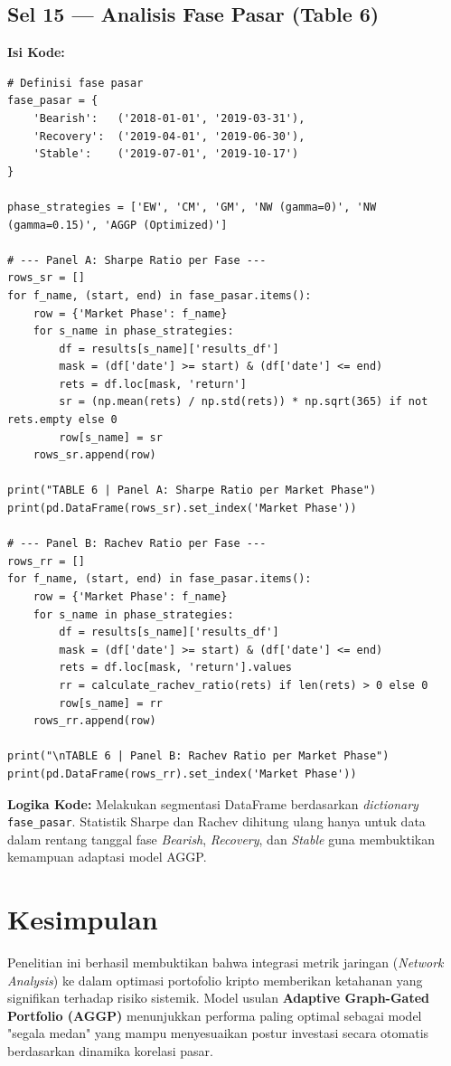 \documentclass[12pt, a4paper]{article}
\begin{document}
\subsection{Sel 15 — Analisis Fase Pasar (Table 6)}
\textbf{Isi Kode:}
\begin{lstlisting}
# Definisi fase pasar
fase_pasar = {
    'Bearish':   ('2018-01-01', '2019-03-31'),
    'Recovery':  ('2019-04-01', '2019-06-30'),
    'Stable':    ('2019-07-01', '2019-10-17')
}

phase_strategies = ['EW', 'CM', 'GM', 'NW (gamma=0)', 'NW (gamma=0.15)', 'AGGP (Optimized)']

# --- Panel A: Sharpe Ratio per Fase ---
rows_sr = []
for f_name, (start, end) in fase_pasar.items():
    row = {'Market Phase': f_name}
    for s_name in phase_strategies:
        df = results[s_name]['results_df']
        mask = (df['date'] >= start) & (df['date'] <= end)
        rets = df.loc[mask, 'return']
        sr = (np.mean(rets) / np.std(rets)) * np.sqrt(365) if not rets.empty else 0
        row[s_name] = sr
    rows_sr.append(row)

print("TABLE 6 | Panel A: Sharpe Ratio per Market Phase")
print(pd.DataFrame(rows_sr).set_index('Market Phase'))

# --- Panel B: Rachev Ratio per Fase ---
rows_rr = []
for f_name, (start, end) in fase_pasar.items():
    row = {'Market Phase': f_name}
    for s_name in phase_strategies:
        df = results[s_name]['results_df']
        mask = (df['date'] >= start) & (df['date'] <= end)
        rets = df.loc[mask, 'return'].values
        rr = calculate_rachev_ratio(rets) if len(rets) > 0 else 0
        row[s_name] = rr
    rows_rr.append(row)

print("\nTABLE 6 | Panel B: Rachev Ratio per Market Phase")
print(pd.DataFrame(rows_rr).set_index('Market Phase'))
\end{lstlisting}
\textbf{Logika Kode:} Melakukan segmentasi DataFrame berdasarkan \textit{dictionary} \texttt{fase\_pasar}. Statistik Sharpe dan Rachev dihitung ulang hanya untuk data dalam rentang tanggal fase \textit{Bearish}, \textit{Recovery}, dan \textit{Stable} guna membuktikan kemampuan adaptasi model AGGP.

\section{Kesimpulan}
Penelitian ini berhasil membuktikan bahwa integrasi metrik jaringan (\textit{Network Analysis}) ke dalam optimasi portofolio kripto memberikan ketahanan yang signifikan terhadap risiko sistemik. Model usulan \textbf{Adaptive Graph-Gated Portfolio (AGGP)} menunjukkan performa paling optimal sebagai model "segala medan" yang mampu menyesuaikan postur investasi secara otomatis berdasarkan dinamika korelasi pasar.
\end{document}
